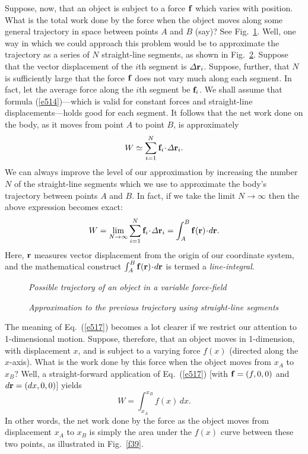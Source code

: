 Suppose, now, that an object is subject to a force ${\bf f}$ which varies with position. What
is the total work done by the force  when the object moves along some
general trajectory in space between points $A$ and $B$ (say)? See Fig.~\ref{f37}.
Well, one way in which we could approach this problem would be to approximate the trajectory
as a series of $N$ straight-line segments, as shown in Fig.~\ref{f38}. Suppose that the
vector displacement of the $i$th segment is ${\mit\Delta}{\bf r}_i$. Suppose, further,
that $N$ is sufficiently large that the force ${\bf f}$ does not vary much
along each segment. In fact, let the average force along the $i$th segment be
${\bf f}_i$. We shall assume that formula (\ref{e514})---which is valid for constant
forces and straight-line displacements---holds good for each segment. It follows that
the net work done on the body, as it moves from point $A$ to
point $B$, is approximately
\begin{equation}
W \simeq \sum_{i=1}^{N} {\bf f}_i\!\cdot\!{\mit\Delta}{\bf r}_i.
\end{equation}
We can always improve the level of our approximation by increasing the number $N$ of the
straight-line segments which we use to approximate the  body's trajectory
between points $A$ and $B$. In fact, if we take the limit $N\rightarrow\infty$
then the above expression becomes exact:
\begin{equation}\label{e517}
W = \lim_{N\rightarrow\infty}  \sum_{i=1}^{N} {\bf f}_i\!\cdot\!{\mit\Delta}{\bf r}_i
= \int_A^B {\bf f}({\bf r})\!\cdot\!d{\bf r}.
\end{equation}
Here, ${\bf r}$ measures vector displacement from the origin of our
coordinate system, and the mathematical
construct $\int_A^B {\bf f}({\bf r})\!\cdot\!d{\bf r}$ is termed a {\em line-integral}.

\begin{figure}
\epsfysize=2in
\centerline{}
\caption{\em Possible trajectory of an object in a variable force-field}\label{f37}   
\end{figure}

\begin{figure}
\epsfysize=2in
\centerline{}
\caption{\em Approximation to the previous trajectory using straight-line segments}\label{f38}   
\end{figure}

The meaning of Eq.~(\ref{e517}) becomes a lot clearer if we restrict our
attention to 1-dimensional motion. Suppose, therefore, that an object moves
in 1-dimension, with displacement $x$, and is subject to a varying force $f(x)$
(directed along the $x$-axis). What is the work done by this force when
the object moves from $x_A$ to $x_B$? Well, a straight-forward
application of Eq.~(\ref{e517}) [with ${\bf f} = (f,0,0)$ and $d{\bf r}=(dx,0,0)$]
yields
\begin{equation}\label{eaax}
W = \int_{x_A}^{x_B} f(x)\,dx.
\end{equation}
In other words, the net work done by the force  as the object moves
from displacement $x_A$ to $x_B$ is simply the area under the $f(x)$ curve
between these two points, as illustrated in Fig.~\ref{f39}.

